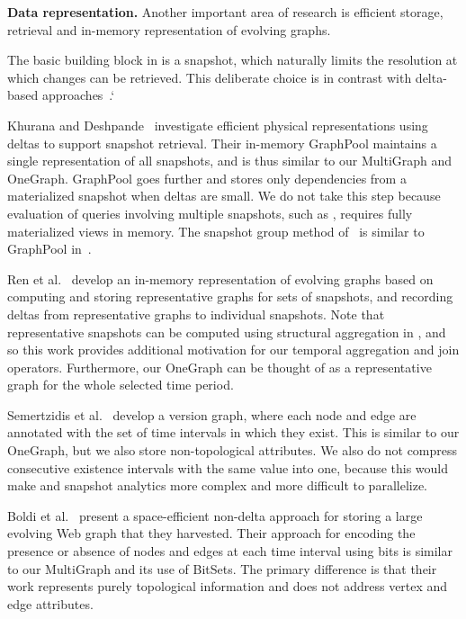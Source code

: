 
{\bf Data representation.}  Another important area of research is
efficient storage, retrieval and in-memory representation of evolving
graphs.  

The basic building block in \ql is a snapshot, which naturally limits
the resolution at which changes can be retrieved. This deliberate
choice is in contrast with delta-based
approaches~\cite{Khurana2013,Koloniari2012,DBLP:journals/tos/MiaoHLWYZPCC15}.`

Khurana and Deshpande~\cite{Khurana2013} investigate efficient
physical representations using deltas to support snapshot retrieval.
Their in-memory GraphPool maintains a single representation of all
snapshots, and is thus similar to our MultiGraph and OneGraph.
GraphPool goes further and stores only dependencies from a
materialized snapshot when deltas are small.  We do not take
this step because evaluation of queries involving multiple snapshots,
such as , requires fully materialized views in memory.
The snapshot group method of~\cite{DBLP:journals/tos/MiaoHLWYZPCC15}
is similar to GraphPool in~\cite{Khurana2013}.

Ren et al.~\cite{Ren2011} develop an in-memory representation of
evolving graphs based on computing and storing representative graphs
for sets of snapshots, and recording deltas from representative graphs
to individual snapshots.  Note that representative snapshots can be
computed using structural aggregation in \ql, and so this work
provides additional motivation for our temporal aggregation and join
operators.  Furthermore, our OneGraph can be thought of as a
representative graph for the whole selected time period.

Semertzidis et al.~\cite{Semertzidis2015} develop a version graph,
where each node and edge are annotated with the set of time intervals
in which they exist.  This is similar to our OneGraph, but we also
store non-topological attributes.  We also do not compress consecutive
existence intervals with the same value into one, because this would
make  and snapshot analytics more complex and more
difficult to parallelize.

Boldi et al.~\cite{Boldi2008} present a space-efficient non-delta
approach for storing a large evolving Web graph that they harvested.
Their approach for encoding the presence or absence of nodes and edges
at each time interval using bits is similar to our MultiGraph and its
use of BitSets.  The primary difference is that their work represents
purely topological information and does not address vertex and edge
attributes.

